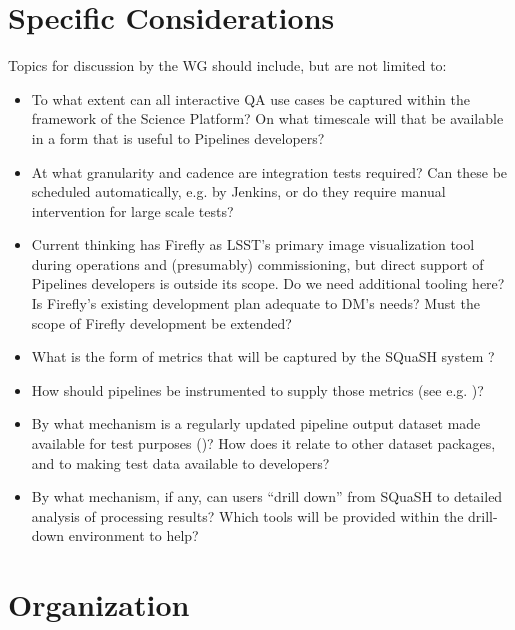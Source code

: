\documentclass[DM,lsstdraft,toc]{lsstdoc}
\begin{document}
\section{Specific Considerations}

Topics for discussion by the WG should include, but are not limited to:

\begin{itemize}

  \item{To what extent can all interactive QA use cases be captured within the
  framework of the Science Platform? On what timescale will that be available
  in a form that is useful to Pipelines developers?}

  \item{At what granularity and cadence are integration tests required? Can
  these be scheduled automatically, e.g. by Jenkins, or do they require manual
  intervention for large scale tests?}

  \item{Current thinking has Firefly as LSST's primary image visualization
  tool during operations and (presumably) commissioning, but direct support of
  Pipelines developers is outside its scope. Do we need additional tooling
  here? Is Firefly's existing development plan adequate to DM's needs? Must
  the scope of Firefly development be extended?}

  \item{What is the form of metrics that will be captured by the SQuaSH system
  ?}

  \item{How should pipelines be instrumented to supply those metrics (see e.g.
  )?}

  \item{By what mechanism is a regularly updated pipeline output dataset made
  available for test purposes ()? How does it relate to other
  dataset packages, and to making test data available to developers?}

  \item{By what mechanism, if any, can users ``drill down'' from SQuaSH to
  detailed analysis of processing results? Which tools will be provided within
  the drill-down environment to help?}

\end{itemize}

\section{Organization}
\end{document}
